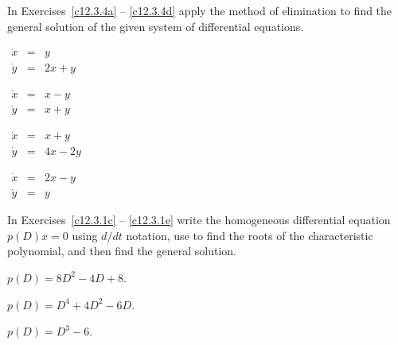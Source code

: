 \documentclass{ximera}
\begin{document}
\noindent In Exercises~\ref{c12.3.4a} -- \ref{c12.3.4d} apply the
method of elimination to find the general solution of the given
system of differential equations.
\begin{exercise} \label{c12.3.4a}
$\begin{array}{rcl}
\dot{x} & = & y\\
\dot{y} & = & 2x+y
\end{array}$
\end{exercise}
\begin{exercise} \label{c12.3.4b}
$\begin{array}{rcl}
\dot{x} & = & x-y\\
\dot{y} & = & x+y
\end{array}$
\end{exercise}
\begin{exercise} \label{c12.3.4c}
$\begin{array}{rcl}
\dot{x} & = & x+y\\
\dot{y} & = & 4x-2y
\end{array}$
\end{exercise}
\begin{exercise} \label{c12.3.4d}
$\begin{array}{rcl}
\dot{x} & = & 2x-y\\
\dot{y} & = & y
\end{array}$
\end{exercise}

\CEXER

\noindent In Exercises~\ref{c12.3.1c} -- \ref{c12.3.1e} write the 
homogeneous differential equation $p(D)x=0$ using $d/dt$ notation,
use \Matlab to find the roots of the characteristic polynomial, and 
then find the general solution.
\begin{exercise}  \label{c12.3.1c}
$p(D) = 8D^2 - 4D +8$.
\end{exercise}
\begin{exercise}  \label{c12.3.1d}
$p(D) = D^4 + 4D^2 - 6D$.
\end{exercise}
\begin{exercise}  \label{c12.3.1e}
$p(D) = D^3 -6$.
\end{exercise}
\end{document}
